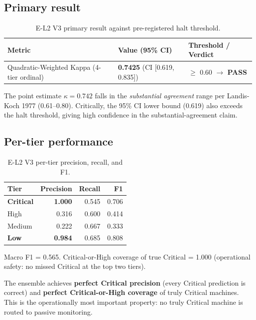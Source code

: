 \subsection{Primary result}

\begin{table}[h!]
\centering
\caption{E-L2 V3 primary result against pre-registered halt threshold.}
\begin{tabular}{lll}
\hline
\textbf{Metric} & \textbf{Value (95\% CI)} & \textbf{Threshold / Verdict} \\
\hline
Quadratic-Weighted Kappa (4-tier ordinal) & \textbf{0.7425} (CI [0.619, 0.835]) & $\geq$ 0.60 $\to$ \textbf{PASS} \\
\hline
\end{tabular}
\end{table}

The point estimate $\kappa = 0.742$ falls in the \emph{substantial agreement} range per Landis-Koch 1977 (0.61--0.80). Critically, the 95\% CI lower bound (0.619) also exceeds the halt threshold, giving high confidence in the substantial-agreement claim.

\subsection{Per-tier performance}

\begin{table}[h!]
\centering
\caption{E-L2 V3 per-tier precision, recall, and F1.}
\begin{tabular}{lrrr}
\hline
\textbf{Tier} & \textbf{Precision} & \textbf{Recall} & \textbf{F1} \\
\hline
\textbf{Critical} & \textbf{1.000} & 0.545 & 0.706 \\
High & 0.316 & 0.600 & 0.414 \\
Medium & 0.222 & 0.667 & 0.333 \\
\textbf{Low} & \textbf{0.984} & 0.685 & 0.808 \\
\hline
\end{tabular}
\end{table}

Macro F1 = 0.565. Critical-or-High coverage of true Critical = 1.000 (operational safety: no missed Critical at the top two tiers).

The ensemble achieves \textbf{perfect Critical precision} (every Critical prediction is correct) and \textbf{perfect Critical-or-High coverage} of truly Critical machines. This is the operationally most important property: no truly Critical machine is routed to passive monitoring.

